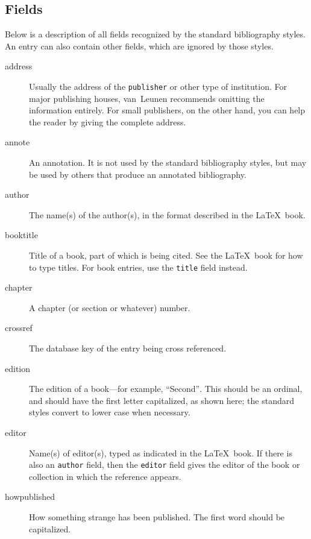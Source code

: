 \subsection{Fields}

Below is a description of all fields
recognized by the standard bibliography styles.
An entry can also contain other fields, which are ignored by those styles.
\begin{description}

\item[address\hfill]
Usually the address of the \hbox{\tt publisher} or other type
of institution.
For major publishing houses,
van~Leunen recommends omitting the information entirely.
For small publishers, on the other hand, you can help the
reader by giving the complete address.

\item[annote\hfill]
An annotation.
It is not used by the standard bibliography styles,
but may be used by others that produce an annotated bibliography.

\item[author\hfill]
The name(s) of the author(s),
in the format described in the \LaTeX\ book.

\item[booktitle\hfill]
Title of a book, part of which is being cited.
See the \LaTeX\ book for how to type titles.
For book entries, use the \hbox{\tt title} field instead.

\item[chapter\hfill]
A chapter (or section or whatever) number.

\item[crossref\hfill]
The database key of the entry being cross referenced.

\item[edition\hfill]
The edition of a book---for example, ``Second''$\!$.
This should be an ordinal, and
should have the first letter capitalized, as shown here;
the standard styles convert to lower case when necessary.

\item[editor\hfill]
Name(s) of editor(s), typed as indicated in the \LaTeX\ book.
If there is also an \hbox{\tt author} field, then
the \hbox{\tt editor} field gives the editor of the book or collection
in which the reference appears.

\item[howpublished\hfill]
How something strange has been published.
The first word should be capitalized.


\end{description}
